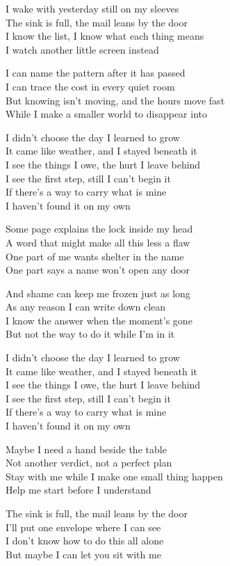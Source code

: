 \begin{lyrics}
I wake with yesterday still on my sleeves\\
The sink is full, the mail leans by the door\\
I know the list, I know what each thing means\\
I watch another little screen instead

I can name the pattern after it has passed\\
I can trace the cost in every quiet room\\
But knowing isn't moving, and the hours move fast\\
While I make a smaller world to disappear into

I didn't choose the day I learned to grow\\
It came like weather, and I stayed beneath it\\
I see the things I owe, the hurt I leave behind\\
I see the first step, still I can't begin it\\
If there's a way to carry what is mine\\
I haven't found it on my own

Some page explains the lock inside my head\\
A word that might make all this less a flaw\\
One part of me wants shelter in the name\\
One part says a name won't open any door

And shame can keep me frozen just as long\\
As any reason I can write down clean\\
I know the answer when the moment's gone\\
But not the way to do it while I'm in it

I didn't choose the day I learned to grow\\
It came like weather, and I stayed beneath it\\
I see the things I owe, the hurt I leave behind\\
I see the first step, still I can't begin it\\
If there's a way to carry what is mine\\
I haven't found it on my own

Maybe I need a hand beside the table\\
Not another verdict, not a perfect plan\\
Stay with me while I make one small thing happen\\
Help me start before I understand

The sink is full, the mail leans by the door\\
I'll put one envelope where I can see\\
I don't know how to do this all alone\\
But maybe I can let you sit with me
\end{lyrics}

